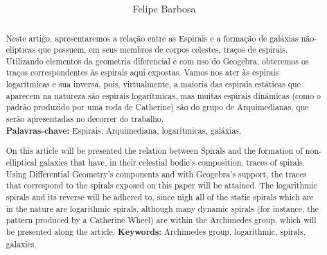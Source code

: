 \documentclass[twoside,a4paper,10pt]{article}
\title{
\titlept{Parametrização de espirais planas sobre imagens de Galáxias} %
\\ 
\titleeng{Parameterization of Flat Spirals on images of Galaxies} %
}
\author{Felipe Barbosa} %
\date{}
\begin{document}
\maketitle %

\thispagestyle{empty} %


\begin{abstract}

\noindent Neste artigo, apresentaremos a relação entre as Espirais e a formação de galáxias não-elípticas que possuem, em seus membros de corpos celestes, traços de espirais. Utilizando elementos da geometria diferencial e com uso do Geogebra, obteremos os traços correspondentes às espirais aqui expostas. Vamos nos ater às espirais logarítmicas e sua inversa, pois, virtualmente, a maioria das espirais estáticas que aparecem na natureza são espirais logarítmicas, mas muitas espirais dinâmicas (como o padrão produzido por uma roda de Catherine) são do grupo de Arquimedianas, que serão apresentadas no decorrer do trabalho.\\
\smallskip
\noindent \textbf{Palavras-chave:} Espirais, Arquimediana, logarítmicas, galáxias. 

\end{abstract}


{
\begin{abstract}

\noindent On this article will be presented the relation between Spirals and the formation of non-elliptical galaxies that have, in their celestial bodie's composition, traces of spirals. Using Differential Geometry’s components and with Geogebra’s support, the traces that correspond to the spirals exposed on this paper will be attained. The logarithmic spirals and its reverse will be adhered to, since nigh all of the static spirals which are in the nature are logarithmic spirals, although many dynamic spirals (for instance, the pattern produced by a Catherine Wheel) are within the Archimedes group, which will be presented along the article.
\smallskip
\linebreak \noindent \textbf{Keywords:} Archimedes group, logarithmic, spirals, galaxies.

\end{abstract}
}
\end{document}
